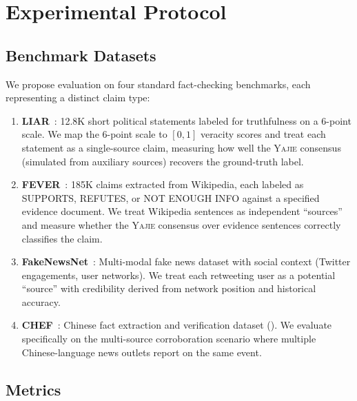 \documentclass[11pt,a4paper]{article}
\theoremstyle{definition}
\newcommand{\Yajie}{\textsc{Yajie}}
\begin{document}
\section{Experimental Protocol }
\label{sec:experiments}

\subsection{Benchmark Datasets}

We propose evaluation on four standard fact-checking benchmarks, each representing a distinct claim type:

\begin{enumerate}[label=(\roman*)]
    \item \textbf{LIAR}~\cite{wang2018}: 12.8K short political statements labeled for truthfulness on a 6-point scale. We map the 6-point scale to $[0, 1]$ veracity scores and treat each statement as a single-source claim, measuring how well the \Yajie{} consensus (simulated from auxiliary sources) recovers the ground-truth label.
    \item \textbf{FEVER}~\cite{thorne2018}: 185K claims extracted from Wikipedia, each labeled as SUPPORTS, REFUTES, or NOT ENOUGH INFO against a specified evidence document. We treat Wikipedia sentences as independent ``sources'' and measure whether the \Yajie{} consensus over evidence sentences correctly classifies the claim.
    \item \textbf{FakeNewsNet}~\cite{shu2020}: Multi-modal fake news dataset with social context (Twitter engagements, user networks). We treat each retweeting user as a potential ``source'' with credibility derived from network position and historical accuracy.
    \item \textbf{CHEF}~\cite{hu2023}: Chinese fact extraction and verification dataset (). We evaluate specifically on the multi-source corroboration scenario where multiple Chinese-language news outlets report on the same event.
\end{enumerate}

\subsection{Metrics}
\end{document}
